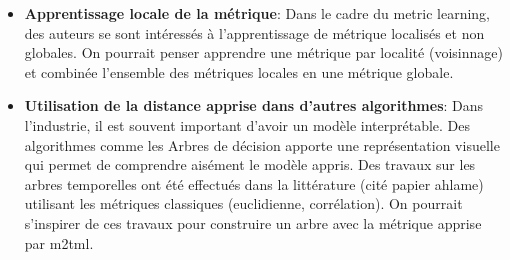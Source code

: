 \begin{itemize}
\begin{itemize}
		\item \textbf{Apprentissage locale de la métrique}: Dans le cadre du metric learning, des auteurs se sont intéressés à l'apprentissage de métrique localisés et non globales. On pourrait penser apprendre une métrique par localité (voisinnage) et combinée l'ensemble des métriques locales en une métrique globale.
		\item \textbf{Utilisation de la distance apprise dans d'autres algorithmes}: Dans l'industrie, il est souvent important d'avoir un modèle interprétable. Des algorithmes comme les Arbres de décision apporte une représentation visuelle qui permet de comprendre aisément le modèle appris. Des travaux sur les arbres temporelles ont été effectués dans la littérature (cité papier ahlame) utilisant les métriques classiques (euclidienne, corrélation). On pourrait s'inspirer de ces travaux pour construire un arbre avec la métrique apprise par m2tml.
		
		
	\end{itemize}
\end{itemize}




